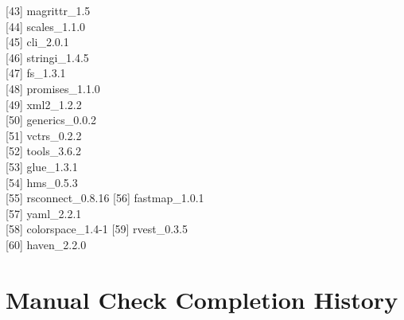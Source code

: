 \documentclass[]{article}
\begin{document}
{[}43{]} magrittr\_1.5\\
{[}44{]} scales\_1.1.0\\
{[}45{]} cli\_2.0.1\\
{[}46{]} stringi\_1.4.5\\
{[}47{]} fs\_1.3.1\\
{[}48{]} promises\_1.1.0\\
{[}49{]} xml2\_1.2.2\\
{[}50{]} generics\_0.0.2\\
{[}51{]} vctrs\_0.2.2\\
{[}52{]} tools\_3.6.2\\
{[}53{]} glue\_1.3.1\\
{[}54{]} hms\_0.5.3\\
{[}55{]} rsconnect\_0.8.16 {[}56{]} fastmap\_1.0.1\\
{[}57{]} yaml\_2.2.1\\
{[}58{]} colorspace\_1.4-1 {[}59{]} rvest\_0.3.5\\
{[}60{]} haven\_2.2.0

\hypertarget{manual-check-completion-history}{%
\section{Manual Check Completion
History}\label{manual-check-completion-history}}
\end{document}
